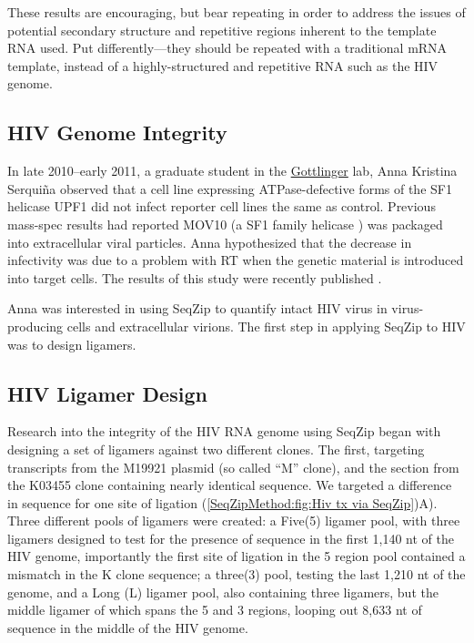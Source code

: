      These results are encouraging, but bear repeating in order to address the issues of potential secondary structure and repetitive regions inherent to the template RNA used. Put differently---they should be repeated with a traditional mRNA template, instead of a highly-structured and repetitive RNA such as the HIV genome.

  \subsection{HIV Genome Integrity}
    \label{SeqZipMethod:subsec: Why use SeqZip to look at HIV genomes}

    In late 2010--early 2011, a graduate student in the \href{http://profiles.umassmed.edu/profiles/display/133484}{Gottlinger} lab, Anna Kristina Serquiña observed that a cell line expressing ATPase-defective forms of the SF1 helicase UPF1 \citep{Bhattacharya2000} did not infect reporter cell lines the same as control. Previous mass-spec results had reported MOV10 (a SF1 family helicase \citep{Gregersen2014}) was packaged into extracellular viral particles. Anna hypothesized that the decrease in infectivity was due to a problem with RT when the genetic material is introduced into target cells. The results of this study were recently published \citep{Serquina2013}.

    Anna was interested in using SeqZip to quantify intact HIV virus in virus-producing cells and extracellular virions. The first step in applying SeqZip to HIV was to design ligamers.

	\subsection{HIV Ligamer Design}
    \label{SeqZipMethod:subsec: Design of HIV ligamers}

	  Research into the integrity of the HIV RNA genome using SeqZip began with designing a set of ligamers against two different clones. The first, targeting transcripts from the M19921 plasmid (so called ``M'' clone), and the section from the K03455 clone containing nearly identical sequence. We targeted a difference in sequence for one site of ligation (\ref{SeqZipMethod:fig:Hiv tx via SeqZip})A). Three different pools of ligamers were created: a Five(5) ligamer pool, with three ligamers designed to test for the presence of sequence in the first 1,140 nt of the HIV genome, importantly the first site of ligation in the 5 region pool contained a mismatch in the K clone sequence; a three(3) pool, testing the last 1,210 nt of the genome, and a Long (L) ligamer pool, also containing three ligamers, but the middle ligamer of which spans the 5 and 3 regions, looping out 8,633 nt of sequence in the middle of the HIV genome. 


